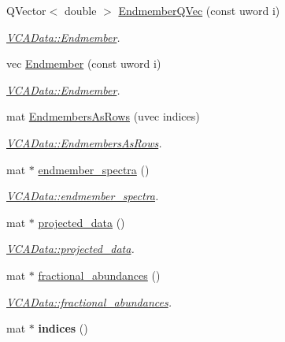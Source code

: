\begin{DoxyCompactItemize}
\item 
Q\+Vector$<$ double $>$ \hyperlink{class_v_c_a_data_a32067c4438e884770607127192ed02dc}{Endmember\+Q\+Vec} (const uword i)
\begin{DoxyCompactList}\small\item\em \hyperlink{class_v_c_a_data_ac29ee6f33857a1ee183a8f993d1578de}{V\+C\+A\+Data\+::\+Endmember}. \end{DoxyCompactList}\item 
vec \hyperlink{class_v_c_a_data_ac29ee6f33857a1ee183a8f993d1578de}{Endmember} (const uword i)
\begin{DoxyCompactList}\small\item\em \hyperlink{class_v_c_a_data_ac29ee6f33857a1ee183a8f993d1578de}{V\+C\+A\+Data\+::\+Endmember}. \end{DoxyCompactList}\item 
mat \hyperlink{class_v_c_a_data_a83e5861a6c4246060d620d0189049587}{Endmembers\+As\+Rows} (uvec indices)
\begin{DoxyCompactList}\small\item\em \hyperlink{class_v_c_a_data_a83e5861a6c4246060d620d0189049587}{V\+C\+A\+Data\+::\+Endmembers\+As\+Rows}. \end{DoxyCompactList}\item 
mat $\ast$ \hyperlink{class_v_c_a_data_acd7a287762f7b8e115aaf957b3d5e1c9}{endmember\+\_\+spectra} ()
\begin{DoxyCompactList}\small\item\em \hyperlink{class_v_c_a_data_acd7a287762f7b8e115aaf957b3d5e1c9}{V\+C\+A\+Data\+::endmember\+\_\+spectra}. \end{DoxyCompactList}\item 
mat $\ast$ \hyperlink{class_v_c_a_data_ab19a41122dca6e545271cd762c7ef90b}{projected\+\_\+data} ()
\begin{DoxyCompactList}\small\item\em \hyperlink{class_v_c_a_data_ab19a41122dca6e545271cd762c7ef90b}{V\+C\+A\+Data\+::projected\+\_\+data}. \end{DoxyCompactList}\item 
mat $\ast$ \hyperlink{class_v_c_a_data_a7637e08200194ce5c55b30f922b42737}{fractional\+\_\+abundances} ()
\begin{DoxyCompactList}\small\item\em \hyperlink{class_v_c_a_data_a7637e08200194ce5c55b30f922b42737}{V\+C\+A\+Data\+::fractional\+\_\+abundances}. \end{DoxyCompactList}\item 
\hypertarget{class_v_c_a_data_ab354f8f70b96ebc590786ef5e2335868}{mat $\ast$ {\bfseries indices} ()}\label{class_v_c_a_data_ab354f8f70b96ebc590786ef5e2335868}


\end{DoxyCompactItemize}
